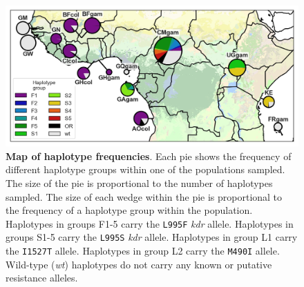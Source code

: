 \documentclass[a4paper,11pt,abstracton,hidelinks]{scrartcl}
\begin{document}
%
\begin{figure}[!t]
  \includegraphics[width=1.1\linewidth,center]{artwork/figure_Phase_2_vgsc_haplotype_frequency.jpg}
  \caption{\textbf{Map of haplotype frequencies}. Each pie shows the frequency of different haplotype groups within one of the populations sampled. The size of the pie is proportional to the number of haplotypes sampled. The size of each wedge within the pie is proportional to the frequency of a haplotype group within the population. Haplotypes in groups F1-5 carry the \texttt{L995F} \textit{kdr} allele. Haplotypes in groups S1-5 carry the \texttt{L995S} \textit{kdr} allele. Haplotypes in group L1 carry the \texttt{I1527T} allele. Haplotypes in group L2 carry the \texttt{M490I} allele. Wild-type (\textit{wt}) haplotypes do not carry any known or putative resistance alleles.}
  \label{fig:map}
\end{figure}
\end{document}
